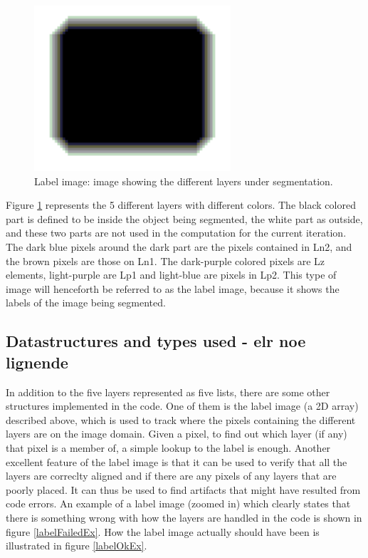 \begin{figure}[h!]
\centering
\includegraphics[width=0.65\textwidth]{sparseFieldCode/labelExample}
\caption{Label image: image showing the different layers under segmentation.}
\label{labelExample}
\end{figure}

Figure \ref{labelExample} represents the 5 different layers with different colors. The black colored part is defined to be inside the object being segmented, the white part as outside, and these two parts are not used in the computation for the current iteration. The dark blue pixels around the dark part are the pixels contained in Ln2, and the brown pixels are those on Ln1. The dark-purple colored pixels are Lz elements, light-purple are Lp1 and light-blue are pixels in Lp2. This type of image will henceforth be referred to as the label image, because it shows the labels of the image being segmented.

\subsection{Datastructures and types used - elr noe lignende}
In addition to the five layers represented as five lists, there are some other structures implemented in the code. One of them is the label image (a 2D array) described above, which is used to track where the pixels containing the different layers are on the image domain. Given a pixel, to find out which layer (if any) that pixel is a member of, a simple lookup to the label is enough. Another excellent feature of the label image is that it can be used to verify that all the layers are correclty aligned and if there are any pixels of any layers that are poorly placed. It can thus be used to find artifacts that might have resulted from code errors. An example of a label image (zoomed in) which clearly states that there is something wrong with how the layers are handled in the code is shown in figure \ref{labelFailedEx}. How the label image actually should have been is illustrated in figure \ref{labelOkEx}.

